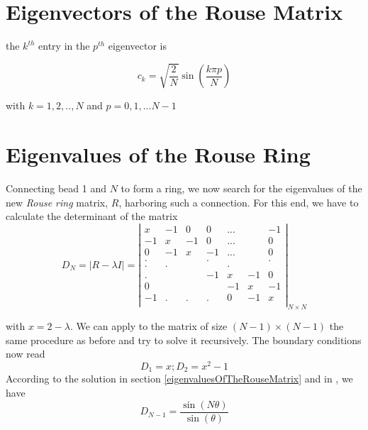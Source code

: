 \documentclass[12pt]{report}
\begin{document}
\section{Eigenvectors of the Rouse Matrix}\label{eigenvectorsOfTheRouseMatrix}
the $k^{th}$ entry in the $p^{th}$ eigenvector is 

\begin{equation*}
c_k = \sqrt{\frac{2}{N}}\sin(\frac{k\pi p}{N})
\end{equation*}

with $k=1,2,..,N$ and $p=0,1,...N-1$

\section{Eigenvalues of the Rouse Ring}\label{eigenvaluesRouseRing}
Connecting bead 1 and $N$ to form a ring, we now search for the eigenvalues of the new \textit{Rouse ring} matrix, $R$, harboring such a connection. For this end, we have to calculate the determinant of the matrix
\begin{equation*}
D_N=|R-\lambda I|=\left|
\begin{matrix}
 x  & -1 &  0 &  0 &...&   & -1 \\
-1  &  x & -1 &  0 &...&   &  0 \\
 0  & -1 &  x & -1 &...&   &  0 \\
 .  &    &    &  . &   &   &  . \\
  . &   .&    &    &  .&   & \\
 .  &    &    & -1 & x &-1 & 0 \\
 0  &    &    &    & -1& x & -1 \\
 -1 &   .&  . & .  &  0&-1 &  x \\     
\end{matrix}
\right|_{N\times N}
\end{equation*}

with $x=2-\lambda$. We can apply to the matrix of size $(N-1)\times (N-1)$ the same procedure as before and try to solve it recursively. The boundary conditions now read
\begin{equation*}
D_1 = x; D_2 = x^2-1
\end{equation*}
According to the solution in section \ref{eigenvaluesOfTheRouseMatrix} and in \cite{lin2011polymer}, we have 
\begin{equation*}
D_{N-1}= \frac{\sin(N\theta)}{\sin(\theta)}
\end{equation*}
\end{document}
